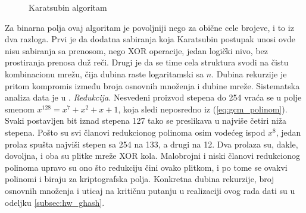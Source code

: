 \begin{figure}[H]
\centering
{}
\caption{Karatsubin algoritam}
\label{fig:karatsuba_ideja}
\end{figure}

Za binarna polja ovaj algoritam je povoljniji nego za obične cele brojeve, i to iz dva razloga. Prvi je da dodatna sabiranja koja Karatsubin postupak unosi ovde nisu sabiranja sa prenosom, nego XOR operacije, jedan logički nivo, bez prostiranja prenosa duž reči. Drugi je da se time cela struktura svodi na čistu kombinacionu mrežu, čija dubina raste logaritamski sa $n$. Dubina rekurzije je pritom kompromis između broja osnovnih množenja i dubine mreže. Sistematska analiza data je u \cite{weimerskirch_paar}.
\smallbreak
\textit{Redukcija.} Nesvedeni proizvod stepena do 254 vraća se u polje smenom $x^{128} = x^7 + x^2 + x + 1$, koja sledi neposredno iz (\ref{eq:gcm_polinom}). Svaki postavljen bit iznad stepena 127 tako se preslikava u najviše četiri niža stepena. Pošto su svi članovi redukcionog polinoma osim vodećeg ispod $x^8$, jedan prolaz spušta najviši stepen sa 254 na 133, a drugi na 12. Dva prolaza su, dakle, dovoljna, i oba su plitke mreže XOR kola. Malobrojni i niski članovi redukcionog polinoma upravo su ono što redukciju čini ovako plitkom, i po tome se ovakvi polinomi i biraju za kriptografska polja.
\smallbreak
Konkretna dubina rekurzije, broj osnovnih množenja i uticaj na kritičnu putanju u realizaciji ovog rada dati su u odeljku \ref{subsec:hw_ghash}.

